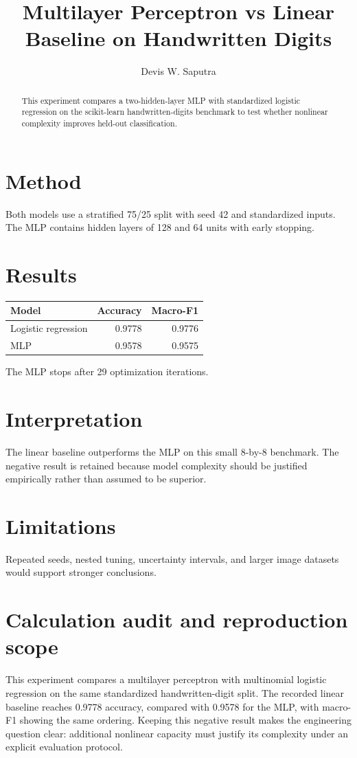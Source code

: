 \documentclass[11pt]{article}
\title{Multilayer Perceptron vs Linear Baseline on Handwritten Digits}
\author{Devis W. Saputra}
\begin{document}
\maketitle

\begin{abstract}
This experiment compares a two-hidden-layer MLP with standardized logistic regression on the scikit-learn handwritten-digits benchmark to test whether nonlinear complexity improves held-out classification.
\end{abstract}

\section{Method}
Both models use a stratified 75/25 split with seed 42 and standardized inputs. The MLP contains hidden layers of 128 and 64 units with early stopping.

\section{Results}
\begin{tabular}{lrr}
\toprule
Model & Accuracy & Macro-F1 \\
\midrule
Logistic regression & 0.9778 & 0.9776 \\
MLP & 0.9578 & 0.9575 \\
\bottomrule
\end{tabular}

The MLP stops after 29 optimization iterations.

\section{Interpretation}
The linear baseline outperforms the MLP on this small 8-by-8 benchmark. The negative result is retained because model complexity should be justified empirically rather than assumed to be superior.

\section{Limitations}
Repeated seeds, nested tuning, uncertainty intervals, and larger image datasets would support stronger conclusions.

\section{Calculation audit and reproduction scope}
This experiment compares a multilayer perceptron with multinomial logistic regression on the same standardized handwritten-digit split. The recorded linear baseline reaches 0.9778 accuracy, compared with 0.9578 for the MLP, with macro-F1 showing the same ordering. Keeping this negative result makes the engineering question clear: additional nonlinear capacity must justify its complexity under an explicit evaluation protocol.
\end{document}
